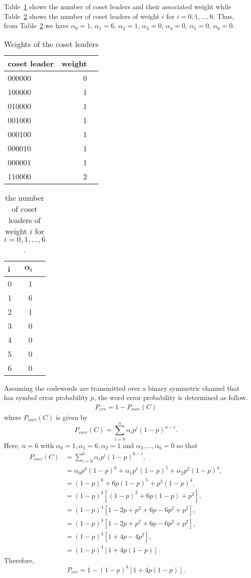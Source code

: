 Table~\ref{tab:10} shows the number of coset leaders and their associated weight while Table~\ref{tab:11} shows the number of coset leaders of weight $i$ for $i=0,1,\ldots,6$. Thus, from Table~\ref{tab:11} we have $\alpha_0=1$, $\alpha_1=6$, $\alpha_2=1$, $\alpha_3=0$, $\alpha_4=0$, $\alpha_5=0$, $\alpha_6=0$. 
\begin{table}[!htp]\centering
\begin{tabular}{lrr}\toprule
\textbf{coset leader} &\textbf{weight} \\\midrule
000000 &0 \\
100000 &1 \\
010000 &1 \\
001000 &1 \\
000100 &1 \\
000010 &1 \\
000001 &1 \\
110000 &2 \\
\bottomrule
\end{tabular}
\caption{Weights of the coset leaders}\label{tab:10}
\end{table}

\begin{table}[!htp]\centering
\begin{tabular}{lrr}\toprule
\textbf{i} &$\bm{\alpha_i}$ \\\midrule
0 &1 \\
1 &6 \\
2 &1 \\
3 &0 \\
4 &0 \\
5 &0 \\
6 &0 \\
\bottomrule
\end{tabular}
\caption{the number of coset leaders of weight $i$ for
$i = 0, 1,\ldots, 6$.}\label{tab:11}
\end{table}
Assuming the codewords are transmitted over a binary symmetric channel that has symbol error probability $p$, the word error probability is determined as follow.
\begin{align*}
	P_{err} = 1 - P_{corr}(C)
\end{align*}
where $P_{corr}(C)$ is given by
\[
	P_{corr}(C) = \sum_{i=0}^n\alpha_i p^i(1-p)^{n-i}.
\]
Here, $n=6$ with $\alpha_0=1, \alpha_1=6, \alpha_2=1$ and $\alpha_3,\ldots,\alpha_6=0$ so that
\begin{align*}
	P_{corr}(C) &= \sum_{i=0}^6\alpha_i p^i(1-p)^{6-i},\\
	&=\alpha_0 p^0(1-p)^6 + \alpha_1 p^1(1-p)^5 + \alpha_2 p^2(1-p)^4,\\
	&=(1-p)^6 + 6 p(1-p)^5 + p^2(1-p)^4,\\
	&=(1-p)^4\left[(1-p)^2 + 6 p(1-p) + p^2\right],\\
	&=(1-p)^4\left[1-2p + p^2 + 6 p-6p^2 + p^2\right],\\
	&=(1-p)^4\left[1-2p + p^2 + 6 p-6p^2 + p^2\right],\\
	&=(1-p)^4\left[1+4p-4p^2\right],\\
	&=(1-p)^4\left[1+4p(1-p)\right].
\end{align*}
Therefore,
\[
	P_{err} = 1 - (1-p)^4\left[1+4p(1-p)\right].
\]
